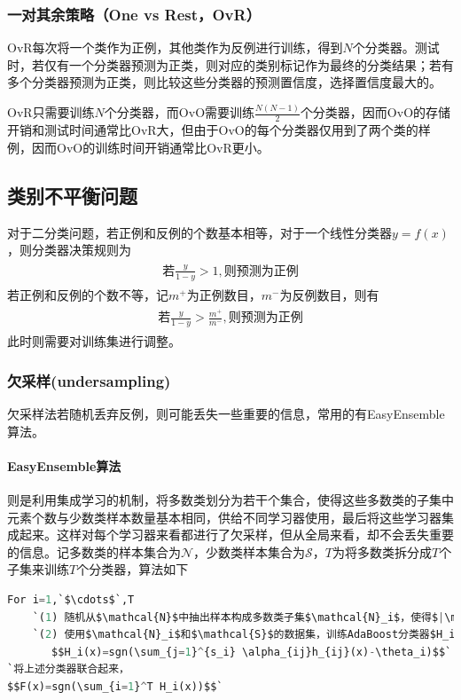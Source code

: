 \subsubsection{一对其余策略（One vs Rest，OvR）}
OvR每次将一个类作为正例，其他类作为反例进行训练，得到$N个$分类器。测试时，若仅有一个分类器预测为正类，则对应的类别标记作为最终的分类结果；若有多个分类器预测为正类，则比较这些分类器的预测置信度，选择置信度最大的。

OvR只需要训练$N$个分类器，而OvO需要训练$\frac{N(N-1)}{2}$个分类器，因而OvO的存储开销和测试时间通常比OvR大，但由于OvO的每个分类器仅用到了两个类的样例，因而OvO的训练时间开销通常比OvR更小。

\subsection{类别不平衡问题}
对于二分类问题，若正例和反例的个数基本相等，对于一个线性分类器$y=f(x)$，则分类器决策规则为
\begin{eqnarray}
\begin{aligned}
\mbox{若}\frac{y}{1-y}>1 , \mbox{则预测为正例}
\end{aligned}
\end{eqnarray}
若正例和反例的个数不等，记$m^+$为正例数目，$m^-$为反例数目，则有
\begin{eqnarray}
\begin{aligned}
\mbox{若}\frac{y}{1-y}>\frac{m^+}{m^-} , \mbox{则预测为正例}
\end{aligned}
\end{eqnarray}
此时则需要对训练集进行调整。
\subsubsection{欠采样(undersampling)}
欠采样法若随机丢弃反例，则可能丢失一些重要的信息，常用的有EasyEnsemble算法。
\paragraph{EasyEnsemble算法}则是利用集成学习的机制，将多数类划分为若干个集合，使得这些多数类的子集中元素个数与少数类样本数量基本相同，供给不同学习器使用，最后将这些学习器集成起来。这样对每个学习器来看都进行了欠采样，但从全局来看，却不会丢失重要的信息。记多数类的样本集合为$\mathcal{N}$，少数类样本集合为$\mathcal{S}$，$T$为将多数类拆分成$T$个子集来训练$T$个分类器，算法如下
\begin{lstlisting}[language=python]
For i=1,`$\cdots$`,T
    `(1) 随机从$\mathcal{N}$中抽出样本构成多数类子集$\mathcal{N}_i$，使得$|\mathcal{N}_i|=|\mathcal{S}|$`
    `(2) 使用$\mathcal{N}_i$和$\mathcal{S}$的数据集，训练AdaBoost分类器$H_i$，其中$h_{ij}(x)$为弱分类器，训练$s_i$次,得到对应的权重$\alpha_{ij}$和阈值$\theta_i$，
       $$H_i(x)=sgn(\sum_{j=1}^{s_i} \alpha_{ij}h_{ij}(x)-\theta_i)$$`
`将上述分类器联合起来，
$$F(x)=sgn(\sum_{i=1}^T H_i(x))$$`
\end{lstlisting}

